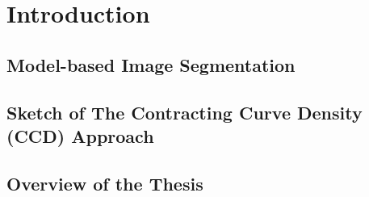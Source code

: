 \chapter{Introduction}
\label{chapter:Introduction}

\section{Model-based Image Segmentation}
\label{sec:mbis}

\section{Sketch of The Contracting Curve Density (CCD) Approach}
\label{sec:sketch}


\section{Overview of the Thesis}
\label{sec:overview}




